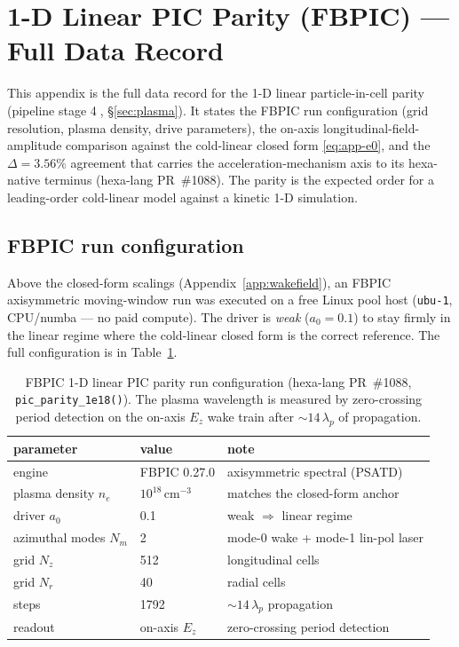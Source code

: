 \section{1-D Linear PIC Parity (FBPIC) --- Full Data Record}
\label{app:pic}

This appendix is the full data record for the 1-D linear
particle-in-cell parity (pipeline stage \textcircled{\scriptsize 4},
\S\ref{sec:plasma}). It states the FBPIC \citep{lehe2016fbpic} run
configuration (grid resolution, plasma density, drive parameters), the
on-axis longitudinal-field-amplitude comparison against the cold-linear
closed form \eqref{eq:app-e0}, and the $\Delta\!=\!3.56\%$ agreement that
carries the acceleration-mechanism axis to its hexa-native terminus
(hexa-lang PR~\#1088). The parity is the expected order for a
leading-order cold-linear model against a kinetic 1-D simulation.

\subsection{FBPIC run configuration}
\label{app:pic-config}

Above the closed-form scalings (Appendix~\ref{app:wakefield}), an FBPIC
axisymmetric moving-window run was executed on a free Linux pool host
(\verb|ubu-1|, CPU/numba --- no paid compute). The driver is
\emph{weak} ($a_0=0.1$) to stay firmly in the linear regime where the
cold-linear closed form is the correct reference. The full configuration
is in Table~\ref{tab:app-pic}.

\begin{table}[h]
\centering
\small
\setlength{\tabcolsep}{6pt}
\begin{tabular}{@{}l l l@{}}
\toprule
parameter & value & note \\
\midrule
engine            & FBPIC 0.27.0        & axisymmetric spectral (PSATD) \\
plasma density $n_e$ & $10^{18}$\,cm$^{-3}$ & matches the closed-form anchor \\
driver $a_0$      & 0.1                 & weak $\Rightarrow$ linear regime \\
azimuthal modes $N_m$ & 2               & mode-0 wake + mode-1 lin-pol laser \\
grid $N_z$        & 512                 & longitudinal cells \\
grid $N_r$        & 40                  & radial cells \\
steps             & 1792                & $\sim\!14\,\lambda_p$ propagation \\
readout           & on-axis $E_z$       & zero-crossing period detection \\
\bottomrule
\end{tabular}
\caption{FBPIC 1-D linear PIC parity run configuration (hexa-lang
PR~\#1088, \texttt{pic\_parity\_1e18()}). The plasma wavelength is
measured by zero-crossing period detection on the on-axis $E_z$ wake
train after $\sim\!14\,\lambda_p$ of propagation.}
\label{tab:app-pic}
\end{table}

